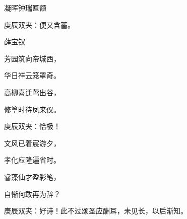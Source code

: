 \begin{poem}
    \begin{pl}凝晖钟瑞匾额\end{pl}
    \begin{note}庚辰双夹：便又含蓄。\end{note} \begin{pl}薛宝钗\end{pl}

    \begin{pl}芳园筑向帝城西，\end{pl}

    \begin{pl}华日祥云笼罩奇。\end{pl}

    \begin{pl}高柳喜迁莺出谷，\end{pl}

    \begin{pl}修篁时待凤来仪。\end{pl}
    \begin{note}庚辰双夹：恰极！\end{note}

    \begin{pl}文风已着宸游夕，\end{pl}

    \begin{pl}孝化应隆遍省时。\end{pl}

    \begin{pl}睿藻仙才盈彩笔，\end{pl}

    \begin{pl}自惭何敢再为辞？\end{pl}
    \begin{note}庚辰双夹：好诗！此不过颂圣应酬耳，未见长，以后渐知。\end{note}

\end{poem}


